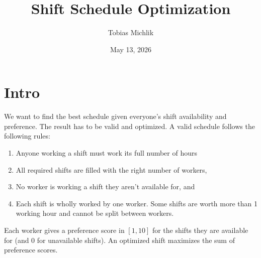 \documentclass{article}
\title{\vspace{-0.5in}Shift Schedule Optimization}
\author{Tobias Michlik}
\date{May 13, 2026}
\begin{document}
\maketitle

\section*{Intro}
We want to find the best schedule given everyone's shift availability and preference. The result has to be valid and optimized. A valid schedule follows the following rules:
\begin{enumerate}
    \item Anyone working a shift must work its full number of hours
    \item All required shifts are filled with the right number of workers,
    \item No worker is working a shift they aren't available for, and
    \item Each shift is wholly worked by one worker. Some shifts are worth more than 1 working hour and cannot be split between workers.
\end{enumerate}
Each worker gives a preference score in $[1,10]$ for the shifts they are available for (and 0 for unavailable shifts). An optimized shift maximizes the sum of preference scores.
\end{document}

